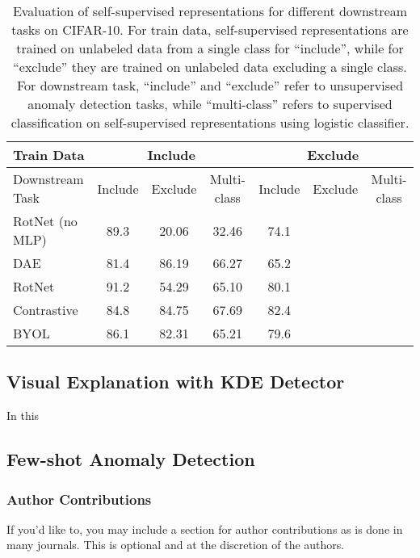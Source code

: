 \documentclass{article} \usepackage{iclr2021_conference,times}
\newcommand{\geotrans}{RotNet}
\newcommand{\contrastive}{Contrastive}
\newcommand{\dae}{DAE}
\begin{document}
\begin{table}[ht]
    \centering
    \small
    \begin{tabular}{l|c|c|c|c|c|c}
        \toprule
        Train Data & \multicolumn{3}{c|}{Include} & \multicolumn{3}{c}{Exclude} \\
        \midrule
        Downstream Task & Include & Exclude & Multi-class & Include & Exclude & Multi-class \\
        \midrule
        {\geotrans} (no MLP) & 89.3 & 20.06 & 32.46 & 74.1 & \\
        {\dae} & 81.4 & 86.19 & 66.27 & 65.2 & \\
        {\geotrans} & 91.2 & 54.29 & 65.10 & 80.1 & \\
        {\contrastive} & 84.8 & 84.75 & 67.69 & 82.4 & \\
        BYOL & 86.1 & 82.31 & 65.21 & 79.6 & \\
        \bottomrule
    \end{tabular}
    \caption{Evaluation of self-supervised representations for different downstream tasks on CIFAR-10. For train data, self-supervised representations are trained on unlabeled data from a single class for ``include'', while for ``exclude'' they are trained on unlabeled data excluding a single class. For downstream task, ``include'' and ``exclude'' refer to unsupervised anomaly detection tasks, while ``multi-class'' refers to supervised classification on self-supervised representations using logistic classifier.}
    \label{tab:my_label}
\end{table}



\subsection{Visual Explanation with KDE Detector}
\label{sec:explain}
In this 


\subsection{Few-shot Anomaly Detection}
\label{sec:fewshot}
\fi


\iffalse
\subsubsection*{Author Contributions}
If you'd like to, you may include  a section for author contributions as is done
in many journals. This is optional and at the discretion of the authors.
\end{document}
